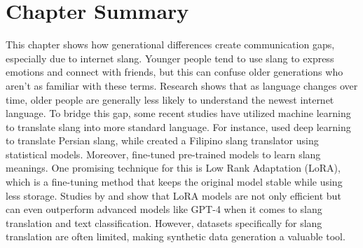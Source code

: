 \section{Chapter Summary}
This chapter shows how generational differences create communication gaps, especially due to internet slang.
Younger people tend to use slang to express emotions and connect with friends, but this can confuse older generations who aren't as familiar with these terms.
Research shows that as language changes over time, older people are generally less likely to understand the newest internet language.
To bridge this gap, some recent studies have utilized machine learning to translate slang into more standard language.
For instance,  used deep learning to translate Persian slang, while  created a Filipino slang translator using statistical models.
Moreover,  fine-tuned pre-trained models to learn slang meanings.
One promising technique for this is Low Rank Adaptation (LoRA), which is a fine-tuning method that keeps the original model stable while using less storage.
Studies by  and  show that LoRA models are not only efficient but can even outperform advanced models like GPT-4 when it comes to slang translation and text classification. 
However, datasets specifically for slang translation are often limited, making synthetic data generation a valuable tool. 